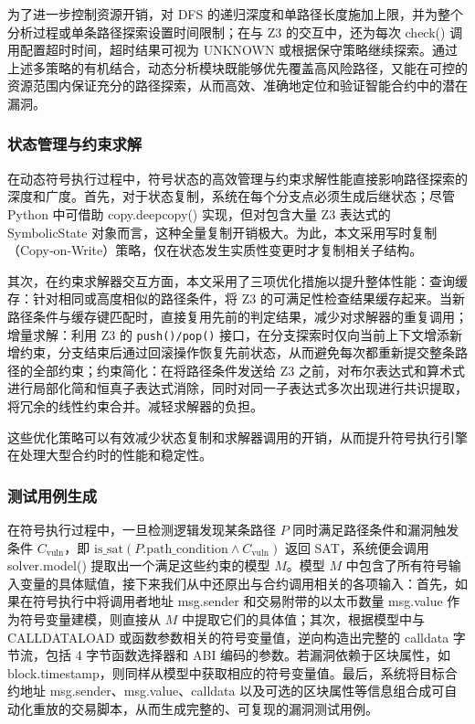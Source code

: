 \documentclass[print, master, vlined, timesmath]{DissertUESTC}
\begin{document}
为了进一步控制资源开销，对 DFS 的递归深度和单路径长度施加上限，并为整个分析过程或单条路径探索设置时间限制；在与 Z3 的交互中，还为每次 check() 调用配置超时时间，超时结果可视为 UNKNOWN 或根据保守策略继续探索。通过上述多策略的有机结合，动态分析模块既能够优先覆盖高风险路径，又能在可控的资源范围内保证充分的路径探索，从而高效、准确地定位和验证智能合约中的潜在漏洞。


\subsubsection{状态管理与约束求解}
在动态符号执行过程中，符号状态的高效管理与约束求解性能直接影响路径探索的深度和广度。首先，对于状态复制，系统在每个分支点必须生成后继状态；尽管 Python 中可借助 copy.deepcopy() 实现，但对包含大量 Z3 表达式的 SymbolicState 对象而言，这种全量复制开销极大。为此，本文采用写时复制（Copy‑on‑Write）策略，仅在状态发生实质性变更时才复制相关子结构。

其次，在约束求解器交互方面，本文采用了三项优化措施以提升整体性能：查询缓存：针对相同或高度相似的路径条件，将 Z3 的可满足性检查结果缓存起来。当新路径条件与缓存键匹配时，直接复用先前的判定结果，减少对求解器的重复调用；增量求解：利用 Z3 的 \texttt{push()/pop()} 接口，在分支探索时仅向当前上下文增添新增约束，分支结束后通过回滚操作恢复先前状态，从而避免每次都重新提交整条路径的全部约束；约束简化：在将路径条件发送给 Z3 之前，对布尔表达式和算术式进行局部化简和恒真子表达式消除，同时对同一子表达式多次出现进行共识提取，将冗余的线性约束合并。减轻求解器的负担。

这些优化策略可以有效减少状态复制和求解器调用的开销，从而提升符号执行引擎在处理大型合约时的性能和稳定性。

\subsubsection{测试用例生成}
在符号执行过程中，一旦检测逻辑发现某条路径 \(P\) 同时满足路径条件和漏洞触发条件 \(C_{\mathrm{vuln}}\)，即 \(\mathrm{is\_sat}(P.\mathrm{path\_condition}\land C_{\mathrm{vuln}})\) 返回 SAT，系统便会调用 solver.model() 提取出一个满足这些约束的模型 \(M\)。模型 \(M\) 中包含了所有符号输入变量的具体赋值，接下来我们从中还原出与合约调用相关的各项输入：首先，如果在符号执行中将调用者地址 msg.sender 和交易附带的以太币数量 msg.value 作为符号变量建模，则直接从 \(M\) 中提取它们的具体值；其次，根据模型中与 CALLDATALOAD 或函数参数相关的符号变量值，逆向构造出完整的 calldata 字节流，包括 4 字节函数选择器和 ABI 编码的参数。若漏洞依赖于区块属性，如 block.timestamp，则同样从模型中获取相应的符号变量值。最后，系统将目标合约地址 msg.sender、msg.value、calldata 以及可选的区块属性等信息组合成可自动化重放的交易脚本，从而生成完整的、可复现的漏洞测试用例。
\end{document}
